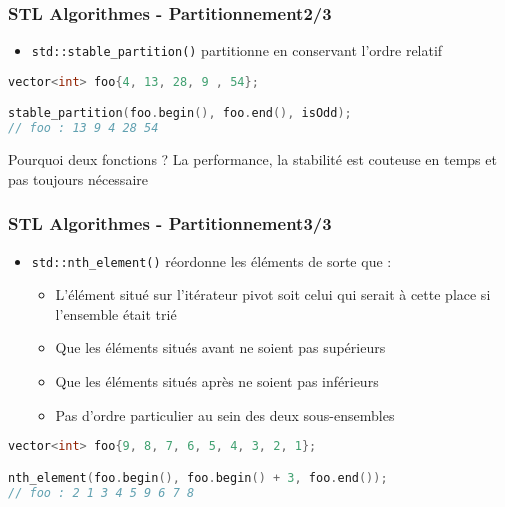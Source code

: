 \documentclass[C++.tex]{subfiles}
\begin{document}
\begin{frame}[fragile]
	\frametitle{STL Algorithmes - Partitionnement\titlehfill{}2/3}
	\begin{itemize}
		\item \lstinline|std::stable_partition()| partitionne en conservant l'ordre relatif
	\end{itemize}

	\begin{lstlisting}[language=C++]
vector<int> foo{4, 13, 28, 9 , 54};

stable_partition(foo.begin(), foo.end(), isOdd);
// foo : 13 9 4 28 54\end{lstlisting}

	\pause

	\begin{block}{Pourquoi deux fonctions ?}
		La performance, la stabilité est couteuse en temps et pas toujours nécessaire
	\end{block}
\end{frame}

\begin{frame}[fragile]
	\frametitle{STL Algorithmes - Partitionnement\titlehfill{}3/3}
	\begin{itemize}
		\item \lstinline|std::nth_element()| réordonne les éléments de sorte que :
		\begin{itemize}
			\item L'élément situé sur l'itérateur pivot soit celui qui serait à cette place si l'ensemble était trié
			\item Que les éléments situés avant ne soient pas supérieurs
			\item Que les éléments situés après ne soient pas inférieurs
			\item Pas d'ordre particulier au sein des deux sous-ensembles
		\end{itemize}
	\end{itemize}


	\begin{lstlisting}[language=C++]
vector<int> foo{9, 8, 7, 6, 5, 4, 3, 2, 1};

nth_element(foo.begin(), foo.begin() + 3, foo.end());
// foo : 2 1 3 4 5 9 6 7 8\end{lstlisting}
\end{frame}
\end{document}
